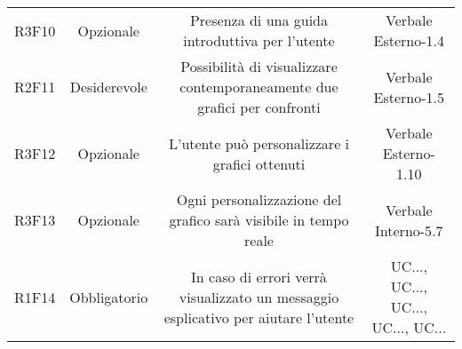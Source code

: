 \begin{center}
\begin{longtable}{C{\colA} C{\colB} C{\colC} C{\colA}}
R3F10 & Opzionale & Presenza di una guida introduttiva per l'utente & Verbale Esterno-1.4\\
R2F11 & Desiderevole & Possibilità di visualizzare contemporaneamente due grafici per confronti & Verbale Esterno-1.5\\
R3F12 & Opzionale & L'utente può personalizzare i grafici ottenuti & Verbale Esterno-1.10 \\
R3F13 & Opzionale & Ogni personalizzazione del grafico sarà visibile in tempo reale & Verbale Interno-5.7 \\
R1F14 & Obbligatorio & In caso di errori verrà visualizzato un messaggio esplicativo per aiutare l'utente & UC..., UC..., UC..., UC..., UC...\\

\end{longtable}
\end{center}



